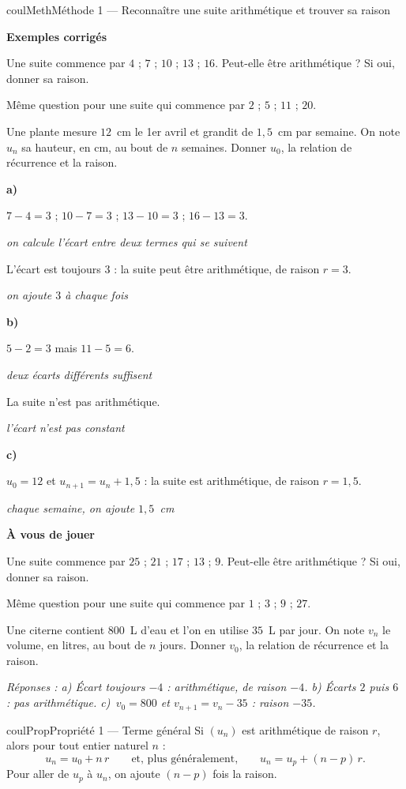 \documentclass[11pt,a4paper]{article}
\makeatletter
\newcounter{lycee@signet}
\newcommand{\signet}[3][]{\stepcounter{lycee@signet}%
  \edef\lycee@dest{\if\relax\detokenize{#1}\relax
    signet.\arabic{lycee@signet}\else#1\fi}%
  \hypertarget{\lycee@dest}{}\bookmark[level=#2,dest=\lycee@dest]{#3}}
\def\textsuperscript#1{#1}\def\dfrac#1#2{#1/#2}\def\frac#1#2{#1/#2}%
\newcommand{\res}[1]{#1}
\newcounter{methode}
\newenvironment{proprietebox}[1][Propriété]%
  {\begin{boitecours}[phantom={\signet{2}{#1}}]{coulProp}{#1}}{\end{boitecours}}
\newenvironment{methodebox}[1][Méthode]{\stepcounter{methode}%
  \begin{boitecours}[phantom={\signet[methode-\arabic{methode}]{2}{#1}}]{coulMeth}{#1}}%
  {\end{boitecours}}
\newcommand{\etape}[1]{\par\smallskip\textbf{\color{coulMeth}#1}\par\nobreak\smallskip}
\newcommand{\reponse}[1]{\par\smallskip
  {\footnotesize\itshape\color{black!55}Réponses : #1}}
\newcommand{\explique}[2]{\par\smallskip\noindent
  \begin{minipage}[t]{0.57\linewidth}\raggedright #1\end{minipage}\hfill
  \begin{minipage}[t]{0.40\linewidth}\raggedright\leavevmode
    {\small\itshape\color{black!60}#2}\end{minipage}\par}
\newcommand{\cas}[1]{\par\smallskip\noindent\textbf{\color{coulExo}#1}\vadjust{\nobreak}}
\newenvironment{correction}{\par}{\par}
\newcommand{\etapeexemples}{\etape{Exemples corrigés}}
\makeatother
\begin{document}
\begin{methodebox}[Méthode 1 --- Reconnaître une suite arithmétique et trouver sa raison]
\etapeexemples
\begin{questions}[label=\alph*)]
  \item Une suite commence par $4$ ;\; $7$ ;\; $10$ ;\; $13$ ;\; $16$. Peut-elle être
        arithmétique ? Si oui, donner sa raison.
  \item Même question pour une suite qui commence par $2$ ;\; $5$ ;\; $11$ ;\; $20$.
  \item Une plante mesure $12$~cm le 1\textsuperscript{er} avril et grandit de $1{,}5$~cm
        par semaine. On note $u_{n}$ sa hauteur, en cm, au bout de $n$ semaines. Donner
        $u_{0}$, la relation de récurrence et la raison.
\end{questions}
\begin{correction}
\cas{a)}
\explique{$7-4=3$ ;\; $10-7=3$ ;\; $13-10=3$ ;\; $16-13=3$.}{on calcule l'écart entre
deux termes qui se suivent}
\explique{L'écart est toujours $3$ : \res{la suite peut être arithmétique}, de raison
$r=\res{3}$.}{on ajoute $3$ à chaque fois}
\cas{b)}
\explique{$5-2=3$ mais $11-5=6$.}{deux écarts différents suffisent}
\explique{\res{La suite n'est pas arithmétique}.}{l'écart n'est pas constant}
\cas{c)}
\explique{$u_{0}=\res{12}$ et $u_{n+1}=\res{u_{n}+1{,}5}$ : la suite est arithmétique, de raison
$r=\res{1{,}5}$.}{chaque semaine, on ajoute $1{,}5$~cm}
\end{correction}

\etape{À vous de jouer}
\begin{questions}[label=\alph*)]
  \item Une suite commence par $25$ ;\; $21$ ;\; $17$ ;\; $13$ ;\; $9$. Peut-elle être
        arithmétique ? Si oui, donner sa raison.
  \item Même question pour une suite qui commence par $1$ ;\; $3$ ;\; $9$ ;\; $27$.
  \item Une citerne contient $800$~L d'eau et l'on en utilise $35$~L par jour. On note
        $v_{n}$ le volume, en litres, au bout de $n$ jours. Donner $v_{0}$, la relation
        de récurrence et la raison.
\end{questions}
\reponse{a) Écart toujours $-4$ : arithmétique, de raison $-4$.\; b) Écarts $2$ puis $6$ :
pas arithmétique.\; c)~$v_{0}=800$ et $v_{n+1}=v_{n}-35$ : raison $-35$.}
\end{methodebox}

\begin{proprietebox}[Propriété 1 --- Terme général]
Si $(u_{n})$ est arithmétique de raison $r$, alors pour tout entier naturel $n$ :
\[
  u_{n}=u_{0}+n\,r
  \qquad\text{et, plus généralement,}\qquad
  u_{n}=u_{p}+(n-p)\,r .
\]
Pour aller de $u_{p}$ à $u_{n}$, on ajoute $(n-p)$ fois la raison.
\end{proprietebox}
\end{document}
